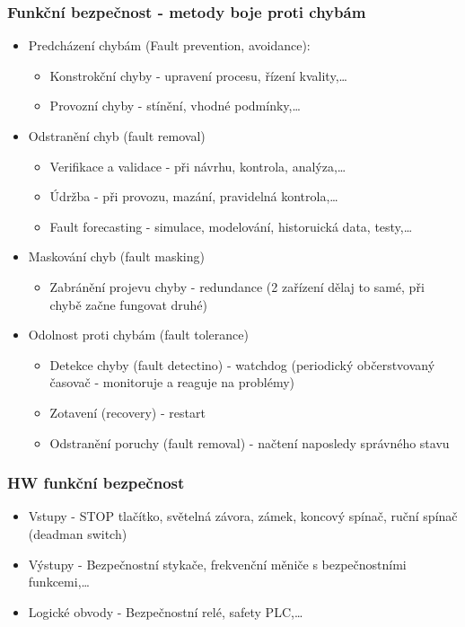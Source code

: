 \subsubsection*{Funkční bezpečnost - metody boje proti chybám}
\begin{itemize}
  \item Predcházení chybám (Fault prevention, avoidance): \begin{itemize}
    \item Konstrokční chyby - upravení procesu, řízení kvality,\dots
    \item Provozní chyby - stínění, vhodné podmínky,\dots
  \end{itemize}
  \item Odstranění chyb (fault removal) \begin{itemize}
    \item Verifikace a validace - při návrhu, kontrola, analýza,\dots
    \item Údržba - při provozu, mazání, pravidelná kontrola,\dots
    \item Fault forecasting - simulace, modelování, historuická data, testy,\dots
  \end{itemize}
  \item Maskování chyb (fault masking) \begin{itemize}
    \item Zabránění projevu chyby - redundance (2 zařízení dělaj to samé, při chybě začne fungovat druhé)
  \end{itemize}
  \item Odolnost proti chybám (fault tolerance) \begin{itemize}
    \item Detekce chyby (fault detectino) - watchdog (periodický občerstvovaný časovač - monitoruje a reaguje na problémy)
    \item Zotavení (recovery) - restart
    \item Odstranění poruchy (fault removal) - načtení naposledy správného stavu 
  \end{itemize}
\end{itemize}

\subsubsection*{HW funkční bezpečnost}
\begin{itemize}
  \item Vstupy - STOP tlačítko, světelná závora, zámek, koncový spínač, ruční spínač (deadman switch)
  \item Výstupy - Bezpečnostní stykače, frekvenční měniče s bezpečnostními funkcemi,\dots
  \item Logické obvody - Bezpečnostní relé, safety PLC,\dots
\end{itemize}

